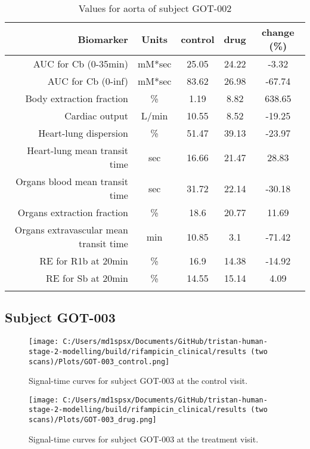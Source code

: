 \documentclass{epflreport}%
\begin{document}
\begin{longtable}{rcccc}%
\hline%
Biomarker&Units&control&drug&change (\%)\\%
\hline%
AUC for Cb (0{-}35min)&mM*sec&25.05&24.22&{-}3.32\\%
AUC for Cb (0{-}inf)&mM*sec&83.62&26.98&{-}67.74\\%
Body extraction fraction&\%&1.19&8.82&638.65\\%
Cardiac output&L/min&10.55&8.52&{-}19.25\\%
Heart{-}lung dispersion&\%&51.47&39.13&{-}23.97\\%
Heart{-}lung mean transit time&sec&16.66&21.47&28.83\\%
Organs blood mean transit time&sec&31.72&22.14&{-}30.18\\%
Organs extraction fraction&\%&18.6&20.77&11.69\\%
Organs extravascular mean transit time&min&10.85&3.1&{-}71.42\\%
RE for R1b at 20min&\%&16.9&14.38&{-}14.92\\%
RE for Sb at 20min&\%&14.55&15.14&4.09\\%
\hline%
\caption{Values for aorta of subject GOT-002} \\%
\end{longtable}%
\clearpage%
\subsection{Subject GOT{-}003}%
\label{subsec:SubjectGOT{-}003}%

%


\begin{figure}[h!]%
\centering%
\texttt{[image: C:/Users/md1spsx/Documents/GitHub/tristan-human-stage-2-modelling/build/rifampicin\_clinical/results (two scans)/Plots/GOT-003\_control.png]}%
\caption{Signal{-}time curves for subject GOT{-}003 at the control visit.}%
\end{figure}

%


\begin{figure}[h!]%
\centering%
\texttt{[image: C:/Users/md1spsx/Documents/GitHub/tristan-human-stage-2-modelling/build/rifampicin\_clinical/results (two scans)/Plots/GOT-003\_drug.png]}%
\caption{Signal{-}time curves for subject GOT{-}003 at the treatment visit.}%
\end{figure}
\end{document}
